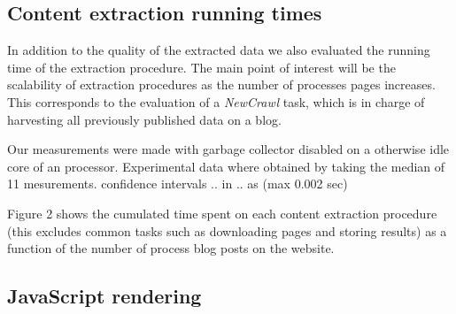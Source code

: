 \subsection{Content extraction running times}

In addition to the quality of the extracted data we also evaluated the running time of the extraction procedure. The main point of interest will be the scalability of extraction procedures as the number of processes pages increases. This corresponds to the evaluation of a \emph{NewCrawl} task, which is in charge of harvesting all previously published data on a blog.

Our measurements were made with garbage collector disabled on a otherwise idle core of an  processor. Experimental data where obtained by taking the median of 11 mesurements. confidence intervals .. in .. as (max 0.002 sec)

Figure 2 shows the cumulated time spent on each content extraction procedure (this excludes common tasks such as downloading pages and storing results) as a function of the number of process blog posts on the  website.





\subsection{JavaScript rendering}





